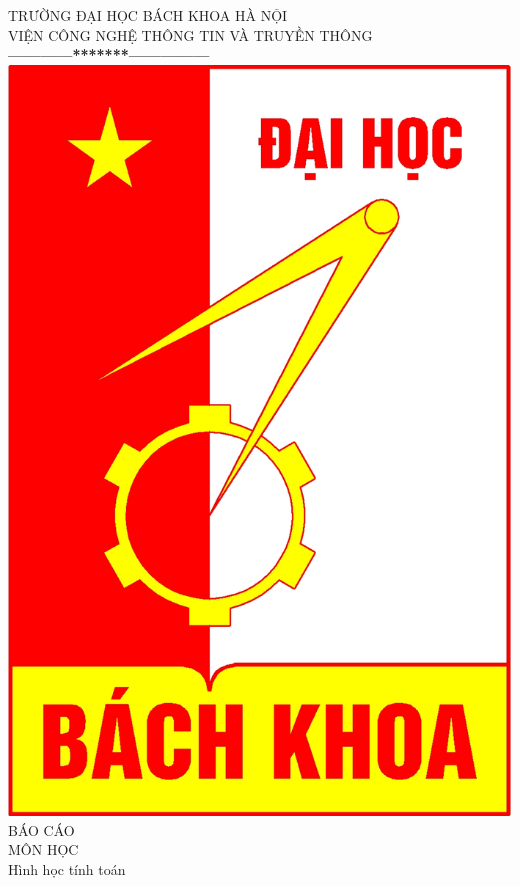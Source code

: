\documentclass[a4paper,12pt]{report}
\begin{document}
\thispagestyle{empty}
\thisfancypage{
\setlength{\fboxrule}{1pt}
\doublebox}{}

\begin{center}
{\fontsize{16}{19}\selectfont TRƯỜNG ĐẠI HỌC BÁCH KHOA HÀ NỘI\\
VIỆN CÔNG NGHỆ THÔNG TIN VÀ TRUYỀN THÔNG}\\
\textbf{------------*******---------------}\\[1cm]
\includegraphics[scale=0.13]{hust.jpg}\\[1.3cm]
{\fontsize{32}{43}\selectfont BÁO CÁO}\\[0.1cm]
{\fontsize{38}{45}\selectfont MÔN HỌC}\\[0.2cm]
{\fontsize{20}{24}\selectfont Hình học tính toán}\\[0.3cm]

\end{center}
\end{document}
